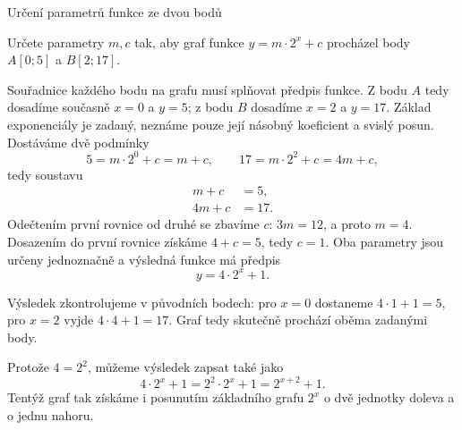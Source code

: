\documentclass[12pt,a4paper]{article}
\begin{document}
\begin{examplebox}{Určení parametrů funkce ze dvou bodů}

Určete parametry $m,c$ tak, aby graf funkce $y=m\cdot2^x+c$
procházel body $A[0;5]$ a $B[2;17]$.

Souřadnice každého bodu na grafu musí splňovat předpis funkce.
Z bodu $A$ tedy dosadíme současně $x=0$ a $y=5$;
z bodu $B$ dosadíme $x=2$ a $y=17$.
Základ exponenciály je zadaný, neznáme pouze její násobný koeficient a svislý posun.
Dostáváme dvě podmínky
\[
    5=m\cdot2^0+c=m+c,\qquad
    17=m\cdot2^2+c=4m+c,
\]
tedy soustavu
\[
\begin{aligned}
    m+c&=5,\\
    4m+c&=17.
\end{aligned}
\]
Odečtením první rovnice od druhé se zbavíme $c$:
$3m=12$, a proto $m=4$.
Dosazením do první rovnice získáme $4+c=5$, tedy $c=1$.
Oba parametry jsou určeny jednoznačně a výsledná funkce má předpis
\[
    y=4\cdot2^x+1.
\]

Výsledek zkontrolujeme v původních bodech:
pro $x=0$ dostaneme $4\cdot1+1=5$, pro $x=2$ vyjde $4\cdot4+1=17$.
Graf tedy skutečně prochází oběma zadanými body.

Protože $4=2^2$, můžeme výsledek zapsat také jako
\[
    4\cdot2^x+1=2^2\cdot2^x+1=2^{x+2}+1.
\]
Tentýž graf tak získáme i posunutím základního grafu $2^x$ o dvě jednotky doleva a o jednu nahoru.
\end{examplebox}
\end{document}
